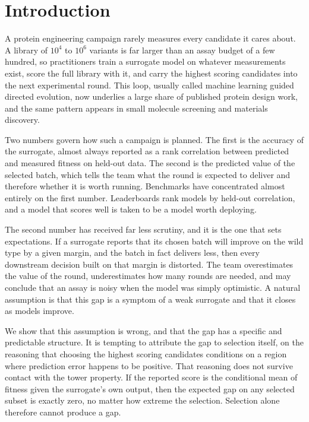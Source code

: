 \documentclass{article}
\theoremstyle{plain}
\theoremstyle{definition}
\begin{document}
\section{Introduction}
\label{sec:intro}

A protein engineering campaign rarely measures every candidate it cares about. A
library of $10^4$ to $10^6$ variants is far larger than an assay budget of a few
hundred, so practitioners train a surrogate model on whatever measurements exist,
score the full library with it, and carry the highest scoring candidates into the next
experimental round. This loop, usually called machine learning guided directed
evolution, now underlies a large share of published protein design work, and the same
pattern appears in small molecule screening and materials discovery.

Two numbers govern how such a campaign is planned. The first is the accuracy of the
surrogate, almost always reported as a rank correlation between predicted and measured
fitness on held-out data. The second is the predicted value of the selected batch,
which tells the team what the round is expected to deliver and therefore whether it is
worth running. Benchmarks have concentrated almost entirely on the first number.
Leaderboards rank models by held-out correlation, and a model that scores well is taken
to be a model worth deploying.

The second number has received far less scrutiny, and it is the one that sets
expectations. If a surrogate reports that its chosen batch will improve on the
wild type by a given margin, and the batch in fact delivers less, then every downstream
decision built on that margin is distorted. The team overestimates the value of the
round, underestimates how many rounds are needed, and may conclude that an assay is
noisy when the model was simply optimistic. A natural assumption is that this gap is a
symptom of a weak surrogate and that it closes as models improve.

We show that this assumption is wrong, and that the gap has a specific and predictable
structure. It is tempting to attribute the gap to selection itself, on the reasoning
that choosing the highest scoring candidates conditions on a region where prediction
error happens to be positive. That reasoning does not survive contact with the tower
property. If the reported score is the conditional mean of fitness given the
surrogate's own output, then the expected gap on any selected subset is exactly zero,
no matter how extreme the selection. Selection alone therefore cannot produce a gap.
\end{document}
